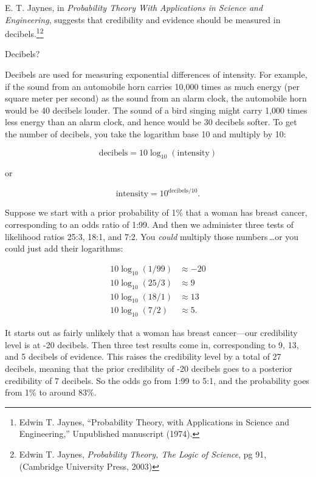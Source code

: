 {\hr

{
 E. T. Jaynes, in \textit{Probability Theory With Applications in
Science and Engineering}, suggests that credibility and evidence should
be measured in decibels.\footnote{Edwin T. Jaynes, ``Probability Theory, with
Applications in Science and Engineering,''
Unpublished manuscript (1974).}\supercomma\footnote{Edwin T. Jaynes, {\em Probability Theory, The Logic of Science}, pg 91, (Cambridge University Press, 2003)}}


 Decibels?


 Decibels are used for measuring exponential differences of
intensity. For example, if the sound from an automobile horn carries
10,000 times as much energy (per square meter per second) as the sound
from an alarm clock, the automobile horn would be 40 decibels louder.
The sound of a bird singing might carry 1,000 times less energy than an
alarm clock, and hence would be 30 decibels softer. To get the number
of decibels, you take the logarithm base 10 and multiply by 10:

\begin{equation*}
  \text{decibels} = 10\log_{10}(\text{intensity})
\end{equation*}


 or

\begin{equation*}
  \text{intensity} = 10^{\text{decibels}/10}.
\end{equation*}


 Suppose we start with a prior probability of 1\% that a woman has
breast cancer, corresponding to an odds ratio of 1:99. And then we
administer three tests of likelihood ratios 25:3, 18:1, and 7:2. You
\textit{could} multiply those numbers\,\ldots or you could just add their
logarithms:

\begin{align*}
 10\log_{10}(1/99) &\approx -20 \\
 10\log_{10}(25/3) &\approx 9 \\
 10\log_{10}(18/1) &\approx 13 \\
 10\log_{10}(7/2) &\approx 5.
\end{align*}


 It starts out as fairly unlikely that a woman has breast
cancer---our credibility level is at -20 decibels. Then three test
results come in, corresponding to 9, 13, and 5 decibels of evidence.
This raises the credibility level by a total of 27 decibels, meaning
that the prior credibility of -20 decibels goes to a posterior
credibility of 7 decibels. So the odds go from 1:99 to 5:1, and the
probability goes from 1\% to around 83\%.

}
